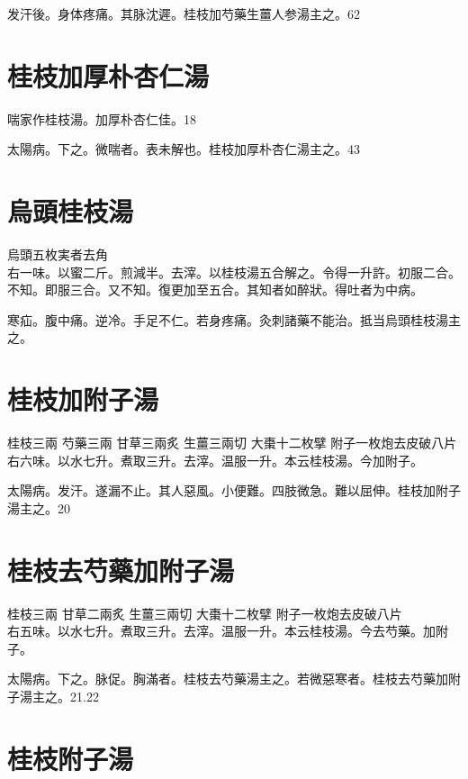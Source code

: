 发汗後。身体疼痛。其脉沈遲。桂枝加芍藥生薑人参湯主之。62

\section{桂枝加厚朴杏仁湯}

喘家作桂枝湯。加厚朴杏仁佳。18

太陽病。下之。微喘者。表未解也。桂枝{\khaai 加厚朴杏仁}湯主之。43

\section{烏頭桂枝湯}

烏頭{\scriptsize 五枚実者去角}\\
右一味。以蜜二斤。煎減半。去滓。以桂枝湯五合解之。令得一升許。初服二合。不知。即服三合。又不知。復更加至五合。其知者如醉狀。得吐者为中病。

寒疝。腹中痛。逆冷。手足不仁。若身疼痛。灸刺諸藥不能治。抵当烏頭桂枝湯主之。

\section{桂枝加附子湯}

桂枝{\scriptsize 三兩} 芍藥{\scriptsize 三兩} 甘草{\scriptsize 三兩炙} 生薑{\scriptsize 三兩切} 大棗{\scriptsize 十二枚擘} 附子{\scriptsize 一枚炮去皮破八片}\\
右六味。以水七升。煮取三升。去滓。温服一升。本云桂枝湯。今加附子。

太陽病。发汗。遂漏不止。其人惡風。小便難。四肢微急。難以屈伸。桂枝加附子湯主之。20

\section{桂枝去芍藥加附子湯}

桂枝{\scriptsize 三兩} 甘草{\scriptsize 二兩炙} 生薑{\scriptsize 三兩切} 大棗{\scriptsize 十二枚擘} 附子{\scriptsize 一枚炮去皮破八片}\\
右五味。以水七升。煮取三升。去滓。温服一升。本云桂枝湯。今去芍藥。加附子。

太陽病。下之。脉促。胸滿者。桂枝去芍藥湯主之。若微{\khaai 惡}寒者。桂枝去芍藥加附子湯主之。21.22

\section{桂枝附子湯}

